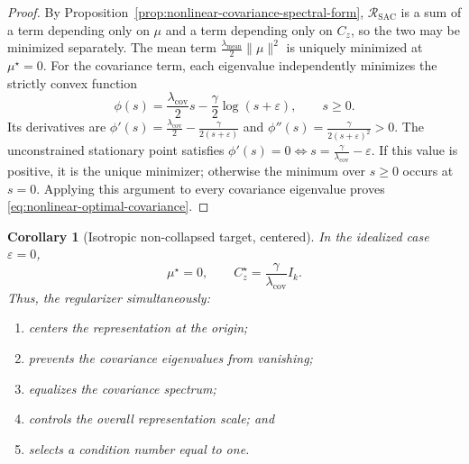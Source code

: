 \documentclass{article} %
\newtheorem{corollary}[theorem]{Corollary}
\theoremstyle{remark}
\begin{document}
\begin{proof}
By Proposition~\ref{prop:nonlinear-covariance-spectral-form}, $\mathcal{R}_{\mathrm{SAC}}$ is a sum
of a term depending only on $\mu$ and a term depending only on $C_z$, so the two may be minimized
separately. The mean term $\frac{\lambda_{\mathrm{mean}}}{2}\|\mu\|^2$ is uniquely minimized at
$\mu^\star=0$. For the covariance term, each eigenvalue independently minimizes the strictly
convex function
\[
\phi(s)
=
\frac{\lambda_{\mathrm{cov}}}{2}s
-
\frac{\gamma}{2}\log(s+\varepsilon),
\qquad
s\geq0.
\]
Its derivatives are $\phi'(s)=\frac{\lambda_{\mathrm{cov}}}{2}-\frac{\gamma}{2(s+\varepsilon)}$ and
$\phi''(s)=\frac{\gamma}{2(s+\varepsilon)^2}>0$. The unconstrained stationary point satisfies
$\phi'(s)=0 \Leftrightarrow s=\frac{\gamma}{\lambda_{\mathrm{cov}}}-\varepsilon$. If this value is
positive, it is the unique minimizer; otherwise the minimum over $s\geq0$ occurs at $s=0$.
Applying this argument to every covariance eigenvalue proves
\eqref{eq:nonlinear-optimal-covariance}.
\end{proof}

\begin{corollary}[Isotropic non-collapsed target, centered]
\label{cor:nonlinear-isotropic-target}
In the idealized case \(\varepsilon=0\),
\begin{equation}
\boxed{
\mu^\star=0,
\qquad
C_z^\star
=
\frac{\gamma}{\lambda_{\mathrm{cov}}}I_k
}.
\label{eq:nonlinear-isotropic-covariance}
\end{equation}
Thus, the regularizer simultaneously:
\begin{enumerate}
    \item centers the representation at the origin;
    \item prevents the covariance eigenvalues from vanishing;
    \item equalizes the covariance spectrum;
    \item controls the overall representation scale; and
    \item selects a condition number equal to one.
\end{enumerate}

\end{corollary}
\end{document}
